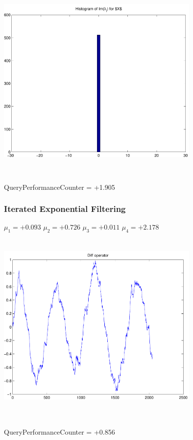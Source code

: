 \documentclass[9pt]{article}
\theoremstyle{plain}
\theoremstyle{definition}
\theoremstyle{remark}
\numberwithin{equation}{section}
\begin{document}
\includegraphics[width=10.0cm,height=10.0cm]{Im_lambda_n.pdf}

QueryPerformanceCounter  =  +1.905
\subsubsection{Iterated Exponential Filtering }
$\mu_1 =+0.093$
$\mu_2 =+0.726$
$\mu_3 =+0.011$
$\mu_4 =+2.178$
\includegraphics[width=10.0cm,height=10.0cm]{DIFF.pdf}

QueryPerformanceCounter  =  +0.856
\end{document}
